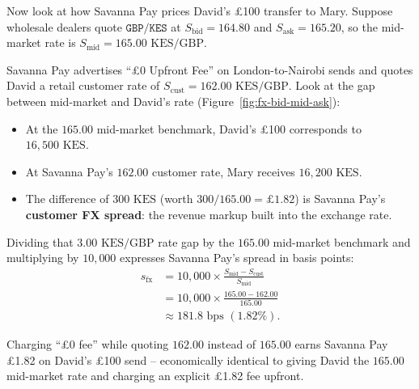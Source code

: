 Now look at how Savanna Pay prices David's \pounds 100 transfer to Mary. Suppose wholesale dealers quote $\texttt{GBP/KES}$ at $S_{\text{bid}} = 164.80$ and $S_{\text{ask}} = 165.20$, so the mid-market rate is $S_{\text{mid}} = 165.00\text{ KES/GBP}$.

Savanna Pay advertises ``\pounds 0 Upfront Fee'' on London-to-Nairobi sends and quotes David a retail customer rate of $S_{\text{cust}} = 162.00\text{ KES/GBP}$. Look at the gap between mid-market and David's rate (Figure~\ref{fig:fx-bid-mid-ask}):
\begin{itemize}
  \item At the $165.00$ mid-market benchmark, David's \pounds 100 corresponds to $16{,}500\text{ KES}$.
  \item At Savanna Pay's $162.00$ customer rate, Mary receives $16{,}200\text{ KES}$.
  \item The difference of $300\text{ KES}$ (worth $300 / 165.00 = \pounds 1.82$) is Savanna Pay's \textbf{customer FX spread}: the revenue markup built into the exchange rate.
\end{itemize}
Dividing that $3.00\text{ KES/GBP}$ rate gap by the $165.00$ mid-market benchmark and multiplying by $10{,}000$ expresses Savanna Pay's spread in basis points:
\begin{align*}
  s_{\text{fx}} &= 10{,}000 \times \frac{S_{\text{mid}} - S_{\text{cust}}}{S_{\text{mid}}} \\
  &= 10{,}000 \times \frac{165.00 - 162.00}{165.00} \\
  &\approx 181.8\text{ bps } (1.82\%).
\end{align*}

Charging ``\pounds 0 fee'' while quoting $162.00$ instead of $165.00$ earns Savanna Pay \pounds 1.82 on David's \pounds 100 send -- economically identical to giving David the $165.00$ mid-market rate and charging an explicit \pounds 1.82 fee upfront.

